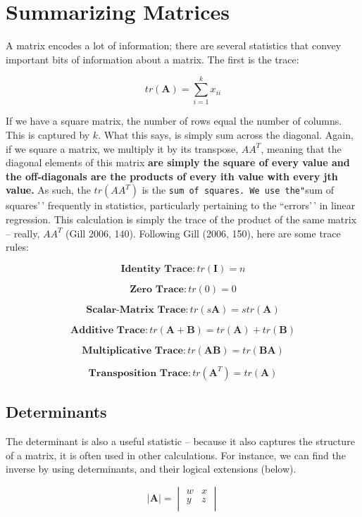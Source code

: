 \documentclass[
]{book}
\begin{document}
\section{Summarizing Matrices}\label{summarizing-matrices}

A matrix encodes a lot of information; there are several statistics that
convey important bits of information about a matrix. The first is the
trace:

\[tr(\textbf{A})=\sum_{i=1}^k x_{ii}\]

If we have a square matrix, the number of rows equal the number of
columns. This is captured by \(k\). What this says, is simply sum across
the diagonal. Again, if we square a matrix, we multiply it by its
transpose, \(AA^{T}\), meaning that the diagonal elements of this matrix
\textbf{are simply the square of every value and the off-diagonals are the
products of every ith value with every jth value.} As such, the
\(tr(AA^{T})\) is the \texttt{sum\ of\ squares.\ We\ use\ the"}sum of squares'\,'
frequently in statistics, particularly pertaining to the ``errors'\,' in
linear regression. This calculation is simply the trace of the product
of the same matrix -- really, \(AA^{T}\) (Gill 2006, 140). Following Gill
(2006, 150), here are some trace rules:

\[\textbf{Identity Trace}: tr(\textbf{I})=n\]

\[\textbf{Zero Trace}: tr(0)=0\]

\[\textbf{Scalar-Matrix Trace}: tr(s\textbf{A})=s tr(\textbf{A})\]

\[\textbf{Additive Trace}: tr(\textbf{A}+\textbf{B})=tr(\textbf{A})+tr(\textbf{B})\]

\[\textbf{Multiplicative Trace}: tr(\textbf{A}\textbf{B})=tr(\textbf{B}\textbf{A})\]

\[\textbf{Transposition Trace}: tr(\textbf{A}^T)=tr(\textbf{A})\]

\subsection{Determinants}\label{determinants}

The determinant is also a useful statistic -- because it also captures
the structure of a matrix, it is often used in other calculations. For
instance, we can find the inverse by using determinants, and their
logical extensions (below).

\[
|\textbf{A}|=\begin{vmatrix}
w&x\\
y&z\\
\end{vmatrix}
\]
\end{document}
